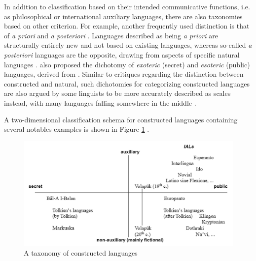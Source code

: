 \documentclass[12pt,a4paper]{article}
\numberwithin{figure}{section}
\numberwithin{table}{section}
\numberwithin{definition}{section}
\begin{document}
In addition to classification based on their intended communicative functions, i.e. as philosophical or international auxiliary languages, there are also taxonomies based on other criterion. For example, another frequently used distinction is that of \textit{a priori} and \textit{a posteriori} \parencite{Schreyer2021article,Gobbo2008article,Schubert1989inbook,Schubert2001book,Novikov2022article,Adelman2014article,Tonkin2015article}. Languages described as being \textit{a priori} are structurally entirely new \parencite{Tonkin2015article} and not based on existing languages, whereas so-called \textit{a posteriori} languages are the opposite, drawing from aspects of specific natural languages \parencite{Schreyer2021article}. \textcite{Gobbo2008article} also proposed the dichotomy of \textit{exoteric} (secret) and \textit{esoteric} (public) languages, derived from \textcite{Bausani1974book}. Similar to critiques regarding the distinction between constructed and natural, such dichotomies for categorizing constructed languages are also argued by some linguists to be more accurately described as scales instead, with many languages falling somewhere in the middle \parencite{Novikov2022article}.

A two-dimensional classification schema for constructed languages containing several notables examples is shown in Figure \ref{fig:taxonomyplannedlanguages} \parencite{Gobbo2016article}.


\begin{figure}
  \centering
        \includegraphics[width=1.0\textwidth]{TaxonomyOfPlannedLanguages.png}
        \caption{A taxonomy of constructed languages \parencite{Gobbo2016article}}
        \label{fig:taxonomyplannedlanguages}
\end{figure}
\end{document}
